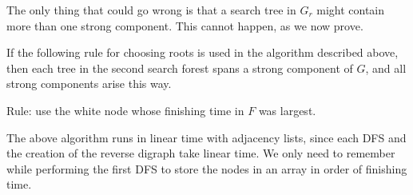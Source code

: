 The only thing that could go wrong is that a search tree in $G_r$
might contain more than one strong component. This cannot happen,
as we now prove.

\begin{Theorem} \label{thm:scc-alg} 
If the following rule for choosing roots is used in the algorithm
described above, then each tree in the second search forest spans a
strong component of $G$, and all strong components arise this way.

Rule: use the white node whose finishing time in $F$ was largest.
\end{Theorem}

%

The above algorithm runs in linear time with adjacency lists, since each
DFS and the creation of the reverse digraph take linear time. We only
need to remember  while performing the first DFS to store the nodes in
an array in order of finishing time. 

%
%


